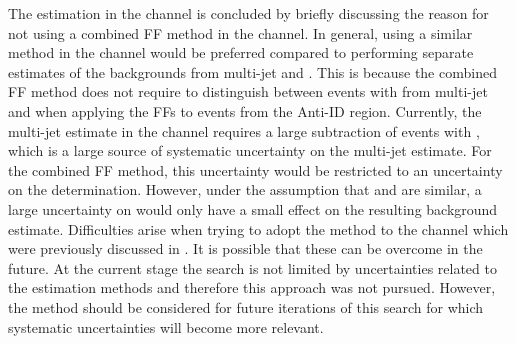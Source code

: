 The \faketauhadvis estimation in the \lephad channel is concluded by briefly
discussing the reason for not using a combined FF method in the \hadhad
channel. In general, using a similar method in the \hadhad channel would be
preferred compared to performing separate estimates of the \faketauhadvis
backgrounds from multi-jet and \ttbar. This is because the combined FF method
does not require to distinguish between events with \faketauhadvis from
multi-jet and \ttbar when applying the FFs to events from the Anti-ID
region. Currently, the multi-jet estimate in the \hadhad channel requires a
large subtraction of \ttbar events with \faketauhadvis, which is a large source
of systematic uncertainty on the multi-jet estimate. For the combined FF method,
this uncertainty would be restricted to an uncertainty on the \rqcd
determination. However, under the assumption that \FFqcd and \FFttbar are
similar, a large uncertainty on \rqcd would only have a small effect on the
resulting \faketauhadvis background estimate. Difficulties arise when trying to
adopt the method to the \hadhad channel which were previously discussed in
. It is possible that these can be overcome in
the future. At the current stage the search is not limited by uncertainties
related to the \faketauhadvis estimation methods and therefore this approach was
not pursued. However, the method should be considered for future iterations of
this search for which systematic uncertainties will become more relevant.

